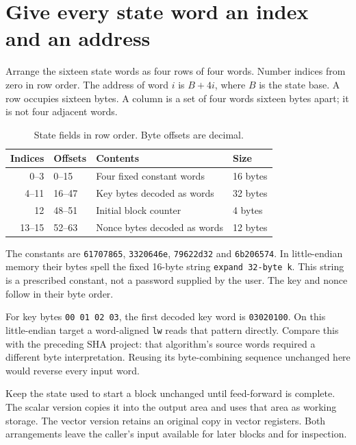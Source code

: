 \section{Give every state word an index and an address}
Arrange the sixteen state words as four rows of four words. Number indices from
zero in row order. The address of word \(i\) is \(B+4i\), where \(B\) is the state
base. A row occupies sixteen bytes. A column is a set of four words sixteen bytes
apart; it is not four adjacent words.

\begin{table}[htbp]
  \centering\caption{State fields in row order. Byte offsets are decimal.}
  \begin{tabular}{rlll}\toprule
    Indices & Offsets & Contents                     & Size     \\\midrule
    0--3    & 0--15   & Four fixed constant words    & 16 bytes \\
    4--11   & 16--47  & Key bytes decoded as words   & 32 bytes \\
    12      & 48--51  & Initial block counter        & 4 bytes  \\
    13--15  & 52--63  & Nonce bytes decoded as words & 12 bytes \\
    \bottomrule\end{tabular}
\end{table}

The constants are \texttt{61707865}, \texttt{3320646e}, \texttt{79622d32} and
\texttt{6b206574}. In little-endian memory their bytes spell the fixed 16-byte
string \texttt{expand 32-byte k}. This string is a prescribed constant, not a
password supplied by the user. The key and nonce follow in their byte order.

For key bytes \texttt{00 01 02 03}, the first decoded key word is
\texttt{03020100}. On this little-endian target a word-aligned \texttt{lw} reads that
pattern directly. Compare this with the preceding SHA project: that algorithm's
source words required a different byte interpretation. Reusing its byte-combining
sequence unchanged here would reverse every input word.

Keep the state used to start a block unchanged until feed-forward is complete.
The scalar version copies it into the output area and uses that area as working
storage. The vector version retains an original copy in vector registers. Both
arrangements leave the caller's input available for later blocks and for inspection.
